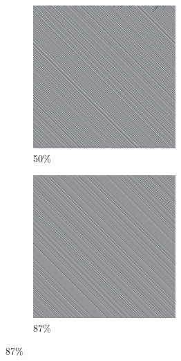 \documentclass[12pt, fleqn]{report}                             %
\theoremstyle{break}                                            %
\begin{document}
\begin{figure}[ht!]
\begin{subfigure}[b]{0.4\linewidth}
          \includegraphics[width=0.6\textwidth]{Images/11/c.png}
          \caption{50\%}
        \end{subfigure}
        \begin{subfigure}[b]{0.4\linewidth}
          \includegraphics[width=0.6\textwidth]{Images/11/d.png}
          \caption{87\%}
        \end{subfigure}
      \end{figure}
\end{document}
